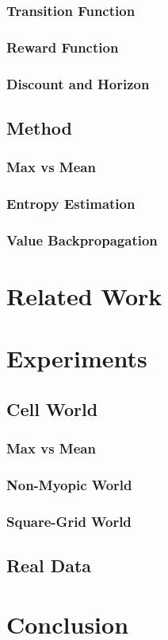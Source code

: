 \documentclass[10pt,twoside]{report}
\begin{document}
        \subsection{Transition Function}
        \subsection{Reward Function}
        \subsection{Discount and Horizon}

    \section{Method}
        \subsection{Max vs Mean}
        \subsection{Entropy Estimation}
        \subsection{Value Backpropagation}

\chapter{Related Work}\label{ref:relwork}


\chapter{Experiments}\label{ref:experiments}
    \section{Cell World}
        \subsection{Max vs Mean}
        \subsection{Non-Myopic World}
        \subsection{Square-Grid World}
    \section{Real Data}

\chapter{Conclusion}\label{ref:conclusion}

\nocite{*}




\end{document}
